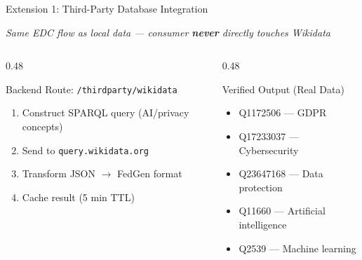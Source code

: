\documentclass[aspectratio=1610, 11pt]{beamer}
\begin{document}
\begin{frame}{Extension 1: Third-Party Database Integration}
\begin{center}
\vspace{0.2em}
{\scriptsize\itshape\color{gray} Same EDC flow as local data --- consumer \textbf{never} directly touches Wikidata}
\end{center}
\vspace{-0.2em}
\begin{columns}[T]
\begin{column}{0.48\textwidth}
\begin{block}{Backend Route: \texttt{/thirdparty/wikidata}}
\scriptsize
\begin{enumerate}\setlength\itemsep{0pt}
  \item Construct SPARQL query (AI/privacy concepts)
  \item Send to \texttt{query.wikidata.org}
  \item Transform JSON $\to$ FedGen format
  \item Cache result (5 min TTL)
\end{enumerate}
\end{block}
\end{column}
\begin{column}{0.48\textwidth}
\begin{exampleblock}{Verified Output (Real Data)}
\scriptsize
\begin{itemize}\setlength\itemsep{0pt}
  \item Q1172506 --- GDPR
  \item Q17233037 --- Cybersecurity
  \item Q23647168 --- Data protection
  \item Q11660 --- Artificial intelligence
  \item Q2539 --- Machine learning
\end{itemize}
\end{exampleblock}
\end{column}
\end{columns}
\end{frame}
\end{document}
